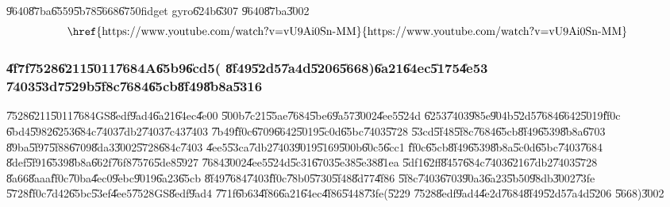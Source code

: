 \bigskip

\U{9640}\U{87ba}\U{6559}\U{5b78}\U{5668}\U{6750}fidget gyro\U{624b}\U{6307}%
\U{9640}\U{87ba}\U{3002}%
\begin{equation*}
\text{\href{https://www.youtube.com/watch?v=vU9Ai0Sn-MM}{%
https://www.youtube.com/watch?v=vU9Ai0Sn-MM}}
\end{equation*}

\clearpage%

\subsubsection{\U{4f7f}\U{7528}\U{6211}\U{5011}\U{7684}A\U{65b9}\U{6cd5}(%
\U{8f49}\U{52d5}\U{7a4d}\U{5206}\U{5668})\U{6a21}\U{64ec}\U{5175}\U{4e53}%
\U{7403}\U{53d7}\U{529b}\U{5f8c}\U{7684}\U{65cb}\U{8f49}\U{8b8a}\U{5316}}

\U{7528}\U{6211}\U{5011}\U{7684}GS\U{8edf}\U{9ad4}\U{6a21}\U{64ec}\U{4e00}%
\U{500b}\U{7c21}\U{55ae}\U{7684}\U{5be6}\U{9a57}\U{3002}\U{4ee5}\U{524d}%
\U{6253}\U{7403}\U{985e}\U{904b}\U{52d5}\U{7684}\U{6642}\U{5019}\U{ff0c}%
\U{6bd4}\U{5982}\U{6253}\U{684c}\U{7403}\U{7db2}\U{7403}\U{7c43}\U{7403}%
\U{7b49}\U{ff0c}\U{6709}\U{6642}\U{5019}\U{5c0d}\U{65bc}\U{7403}\U{5728}%
\U{53cd}\U{5f48}\U{5f8c}\U{7684}\U{65cb}\U{8f49}\U{6539}\U{8b8a}\U{6703}%
\U{89ba}\U{5f97}\U{5f88}\U{6709}\U{8da3}\U{3002}\U{5728}\U{684c}\U{7403}%
\U{4ee5}\U{53ca}\U{7db2}\U{7403}\U{9019}\U{5169}\U{500b}\U{60c5}\U{6cc1}%
\U{ff0c}\U{65cb}\U{8f49}\U{6539}\U{8b8a}\U{5c0d}\U{65bc}\U{7403}\U{7684}%
\U{8def}\U{5f91}\U{6539}\U{8b8a}\U{662f}\U{76f8}\U{7576}\U{5de8}\U{5927}%
\U{7684}\U{3002}\U{4ee5}\U{524d}\U{5c31}\U{6703}\U{5e38}\U{5e38}\U{81ea}%
\U{5df1}\U{62ff}\U{8457}\U{684c}\U{7403}\U{6216}\U{7db2}\U{7403}\U{5728}%
\U{8a66}\U{8aaa}\U{ff0c}\U{70ba}\U{4ec0}\U{9ebc}\U{9019}\U{6a23}\U{65cb}%
\U{8f49}\U{7684}\U{7403}\U{ff0c}\U{78b0}\U{5730}\U{5f48}\U{8d77}\U{4f86}%
\U{5f8c}\U{7403}\U{6703}\U{90a3}\U{6a23}\U{5b50}\U{98db}\U{3002}\U{73fe}%
\U{5728}\U{ff0c}\U{7d42}\U{65bc}\U{53ef}\U{4ee5}\U{7528}GS\U{8edf}\U{9ad4}%
\U{771f}\U{6b63}\U{4f86}\U{6a21}\U{64ec}\U{4f86}\U{5448}\U{73fe}(\U{5229}%
\U{7528}\U{8edf}\U{9ad4}\U{4e2d}\U{7684}\U{8f49}\U{52d5}\U{7a4d}\U{5206}%
\U{5668})\U{3002}

\bigskip

